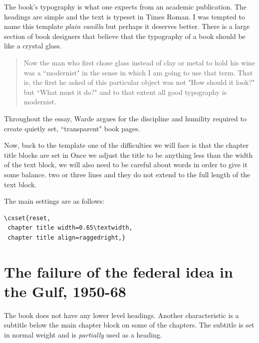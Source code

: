 The book’s typography is what one expects from an academic publication. The headings are simple and the text is typeset in Times Roman. I was tempted to name this template \emph{plain vanilla} but perhaps it deserves better.
There is a large section of book designers that believe that the typography of a book should be like a crystal glass.

\begin{quote}
Now the man who first chose glass instead of clay or metal to hold his wine was a ``modernist" in the sense in which I am going to use that term. That is, the first he asked of this particular object was not "How should it look?" but ``What must it do?" and to that extent all good typography is modernist.	
\end{quote}

Throughout the essay, Warde argues for the discipline and humility required to create quietly set, ``transparent" book pages.

Now, back to the template one of the difficulties we will face is that the chapter title blocks are set in Once we adjust the title to be anything less than the width of the text block, we will also need to be careful
about words in order to give it some balance.
two or three lines and they do not extend to the full length of the text block.

The main settings are as follows:

\begin{verbatim}
\cxset{reset,
 chapter title width=0.65\textwidth,
 chapter title align=raggedright,}
\end{verbatim}


\chapter{The failure of the federal idea in the Gulf, 1950-68}

The book does not have any lower level headings. Another characteristic is a subtitle below the main chapter block on some of the chapters. The subtitle is set in normal weight and is \emph{partially} used as a heading. 

\testsections




